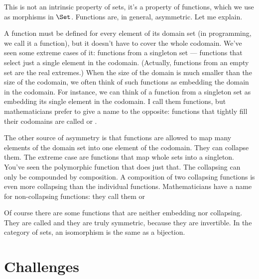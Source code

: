 This is not an intrinsic property of sets, it's a property of functions,
which we use as morphisms in $\Set$. Functions are, in general,
asymmetric. Let me explain.

A function must be defined for every element of its domain set (in
programming, we call it a  function), but it doesn't have to
cover the whole codomain. We've seen some extreme cases of it: functions
from a singleton set --- functions that select just a single element in
the codomain. (Actually, functions from an empty set are the real
extremes.) When the size of the domain is much smaller than the size of
the codomain, we often think of such functions as embedding the domain
in the codomain. For instance, we can think of a function from a
singleton set as embedding its single element in the codomain. I call
them  functions, but mathematicians prefer to give a
name to the opposite: functions that tightly fill their codomains are
called  or .

The other source of asymmetry is that functions are allowed to map many
elements of the domain set into one element of the codomain. They can
collapse them. The extreme case are functions that map whole sets into a
singleton. You've seen the polymorphic  function that does
just that. The collapsing can only be compounded by composition. A
composition of two collapsing functions is even more collapsing than the
individual functions. Mathematicians have a name for non-collapsing
functions: they call them  or 

Of course there are some functions that are neither embedding nor
collapsing. They are called  and they are truly
symmetric, because they are invertible. In the category of sets, an
isomorphism is the same as a bijection.

\section{Challenges}

